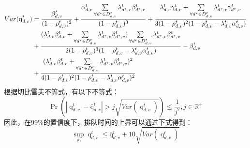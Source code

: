 \begin{align}
	{Var}(\operatorname{q}_{d, v}^t) &= \frac{\beta_{d, v}^t}{(1- \rho_{d, v}^{t})^2} + \frac{\alpha_{d, v}^t \sum\limits_{\forall d^* \in D_{d, v}^t} \lambda_{d^*, v}^t \beta_{d^*, v}^t}{(1- \rho_{d, v}^{t})^3} + \frac{\lambda_{d, v}^{t} \gamma_{d, v}^t + \sum\limits_{\forall d^* \in D_{d, v}^t} \lambda_{d^*, v}^t \gamma_{d^*, v}^t}{3(1- \rho_{d, v}^{t})^2(1-\rho_{d, v}^{t} - \lambda_{d, v}^{t}  \alpha_{d, v}^t)} \notag \\ 
	& + \frac{(\lambda_{d, v}^{t} \beta_{d, v}^t + \sum\limits_{\forall d^* \in D_{d, v}^t} \lambda_{d^*, v}^t \beta_{d^*, v}^t) \sum\limits_{\forall d^* \in D_{d, v}^t} \lambda_{d^*, v}^t \beta_{d^*, v}^t }{2(1- \rho_{d, v}^{t})^3(1-\rho_{d, v}^{t} - \lambda_{d, v}^{t}  \alpha_{d, v}^t)} - \beta_{d, v}^t \notag \\
	& + \frac{(\lambda_{d, v}^{t} \beta_{d, v}^t + \sum\limits_{\forall d^* \in D_{d, v}^t} \lambda_{d^*, v}^t \beta_{d^*, v}^t)^2}{4(1- \rho_{d, v}^{t})^2(1-\rho_{d, v}^{t} - \lambda_{d, v}^{t}  \alpha_{d, v}^t)^2}
\label{equ 2.7}
\end{align}
根据切比雪夫不等式，有以下不等式：
\begin{equation}
	\operatorname{Pr}(|\operatorname{q}_{d, v}^t - \operatorname{\bar{q}}_{d, v}^t| > j \sqrt{{Var}(\operatorname{q}_{d, v}^t)}) \leq \frac{1}{j^2}, j \in \mathbb{R}^{+}
\end{equation}
因此，在99\%的置信度下，排队时间的上界可以通过下式得到：
\begin{equation}
	\sup_{\operatorname{Pr}}{\operatorname{q}_{d, v}^t} \leq \operatorname{\bar{q}}_{d, v}^t + 10  \sqrt{{Var}(\operatorname{q}_{d, v}^t)}
\end{equation}

